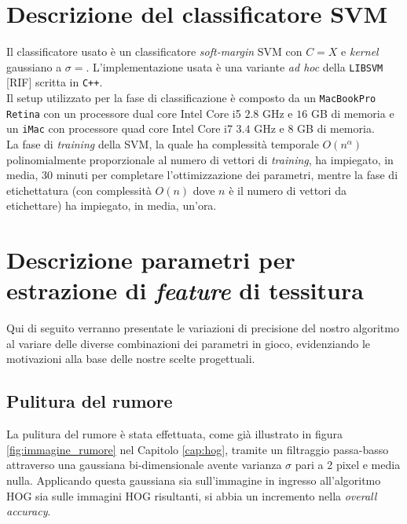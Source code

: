 \section{Descrizione del classificatore SVM}
Il classificatore usato è un classificatore \emph{soft-margin} SVM con $C=X$ e \emph{kernel} gaussiano a $\sigma = $. L'implementazione usata è una variante \emph{ad hoc} della \texttt{LIBSVM} [RIF] scritta in \texttt{C++}.\\
Il setup utilizzato per la fase di classificazione è composto da un \texttt{MacBookPro Retina} con un processore dual core Intel Core i5 $2.8$ GHz e $16$ GB di memoria e un \texttt{iMac} con processore quad core Intel Core i7 $3.4$ GHz e $8$ GB di memoria. \\

La fase di \emph{training} della SVM, la quale ha complessità temporale $O(n^\alpha)$ polinomialmente proporzionale al numero di vettori di \emph{training}, ha impiegato, in media, 30 minuti per completare l'ottimizzazione dei parametri, mentre la fase di etichettatura (con complessità $O(n)$ dove $n$ è il numero di vettori da etichettare) ha impiegato, in media, un'ora.

%

\section{Descrizione parametri per estrazione di \emph{feature} di tessitura}
Qui di seguito verranno presentate le variazioni di precisione del nostro algoritmo al variare delle diverse combinazioni dei parametri in gioco, evidenziando le motivazioni alla base delle nostre scelte progettuali.

\subsection{Pulitura del rumore}
La pulitura del rumore è stata effettuata, come già illustrato in figura \ref{fig:immagine_rumore} nel Capitolo \ref{cap:hog}, tramite un filtraggio passa-basso attraverso una gaussiana bi-dimensionale avente varianza $\sigma$ pari a 2 pixel e media nulla. Applicando questa gaussiana sia sull'immagine in ingresso all'algoritmo HOG sia sulle immagini HOG risultanti, si abbia un incremento nella \emph{overall accuracy}.

